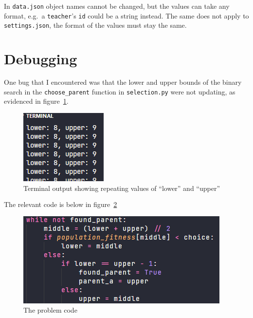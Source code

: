 \documentclass[a4paper, 12pt]{report}
\begin{document}
In \verb|data.json| object names cannot be changed, but the values can take any 
format, e.g.\ a \verb|teacher|'s \verb|id| could be a string instead.
The same does not apply to \verb|settings.json|, the format of the values must 
stay the same.

\newpage

\section{Debugging}

One bug that I encountered was that the lower and upper bounds of the binary 
search in the \verb|choose_parent| function in \verb|selection.py| were not
updating, as evidenced in figure~\ref*{fig:terminal-output-1}.
\begin{figure}[ht]
	\centering
	\includegraphics[scale=0.8]{images/binary-search-2}
	\caption{Terminal output showing repeating values of ``lower'' and 
		``upper''}
	\label{fig:terminal-output-1}
\end{figure}

The relevant code is below in figure~\ref*{fig:code-2}
\begin{figure}[ht]
	\centering
	\includegraphics[scale=0.7]{images/binary-search-3}
	\caption{The problem code}
	\label{fig:code-2}
\end{figure}
\end{document}
